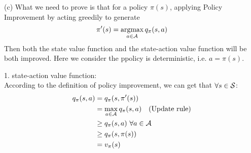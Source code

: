 \begin{homeworkProblem}
(c) What we need to prove is that for a policy $\pi(s)$, applying Policy Improvement by acting greedily to generate
$$\pi'(s) = \mathop{\rm argmax}_{a\in\mathcal{A}} q_{\pi}(s,a)$$
Then both the state value function and the state-action value function will be both improved. Here we consider the ppolicy is deterministic, i.e. $a=\pi(s)$.

1. state-action value function: \\
According to the definition of policy improvement, we can get that $\forall s\in\mathcal{S}$:
\begin{align*}
q_{\pi}(s,a) &= q_{\pi}(s,\pi'(s)) \\
&= \max_{a\in\mathcal{A}}q_{\pi}(s,a) \quad\text{(Update rule)} \\
&\geq q_{\pi}(s,a) \ \forall a\in\mathcal{A} \\
&\geq q_{\pi}(s,\pi(s)) \\
&= v_{\pi}(s)
\end{align*}


\end{homeworkProblem}
